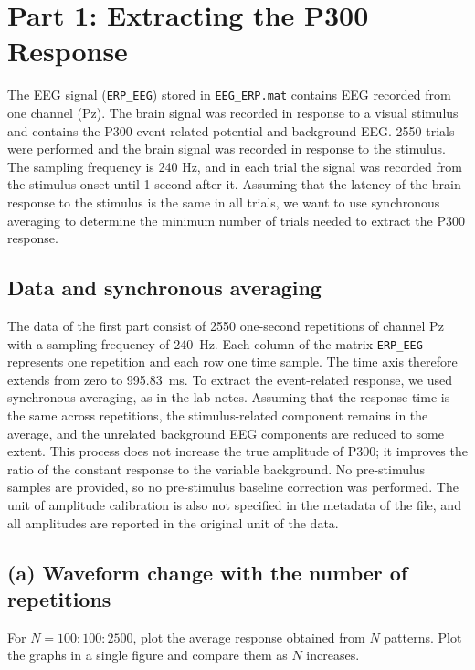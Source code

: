 \section{Part 1: Extracting the P300 Response}

\begin{taskbox}
The EEG signal (\texttt{ERP\_EEG}) stored in \texttt{EEG\_ERP.mat} contains EEG recorded from one channel (Pz). The brain signal was recorded in response to a visual stimulus and contains the P300 event-related potential and background EEG. 2550 trials were performed and the brain signal was recorded in response to the stimulus. The sampling frequency is 240 Hz, and in each trial the signal was recorded from the stimulus onset until 1 second after it. Assuming that the latency of the brain response to the stimulus is the same in all trials, we want to use synchronous averaging to determine the minimum number of trials needed to extract the P300 response.
\end{taskbox}

\subsection*{Data and synchronous averaging}

The data of the first part consist of 2550 one-second repetitions of channel Pz with a sampling frequency of 240~Hz. Each column of the matrix \texttt{ERP\_EEG} represents one repetition and each row one time sample. The time axis therefore extends from zero to 995.83~ms. To extract the event-related response, we used synchronous averaging, as in the lab notes. Assuming that the response time is the same across repetitions, the stimulus-related component remains in the average, and the unrelated background EEG components are reduced to some extent. This process does not increase the true amplitude of P300; it improves the ratio of the constant response to the variable background. No pre-stimulus samples are provided, so no pre-stimulus baseline correction was performed. The unit of amplitude calibration is also not specified in the metadata of the file, and all amplitudes are reported in the original unit of the data.

\subsection*{(a) Waveform change with the number of repetitions}
\begin{taskbox}
For $N=100{:}100{:}2500$, plot the average response obtained from $N$ patterns. Plot the graphs in a single figure and compare them as $N$ increases.
\end{taskbox}

